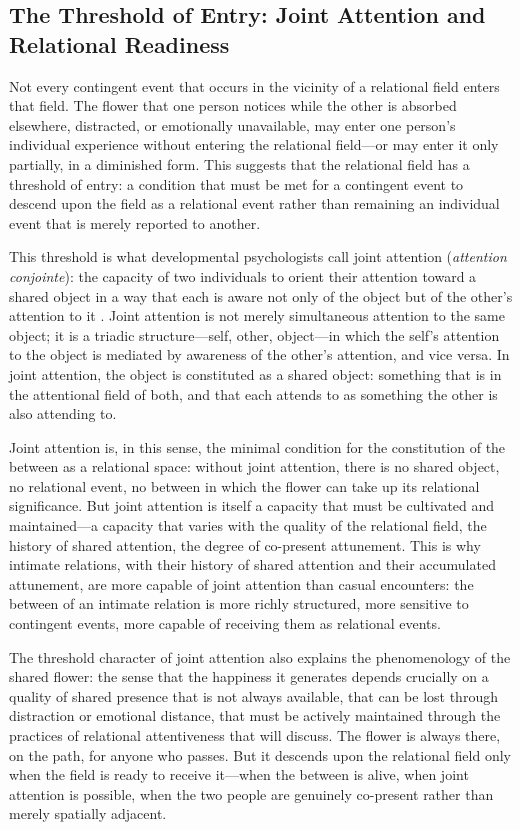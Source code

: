 \subsection{The Threshold of Entry: Joint Attention and Relational Readiness}
\label{p14:subsec:threshold}

\noindent
Not every contingent event that occurs in the vicinity of a relational field enters that field. The flower that one person notices while the other is absorbed elsewhere, distracted, or emotionally unavailable, may enter one person's individual experience without entering the relational field---or may enter it only partially, in a diminished form. This suggests that the relational field has a threshold of entry: a condition that must be met for a contingent event to descend upon the field as a relational event rather than remaining an individual event that is merely reported to another.

This threshold is what developmental psychologists call joint attention (\emph{attention conjointe}): the capacity of two individuals to orient their attention toward a shared object in a way that each is aware not only of the object but of the other's attention to it \parencite{hasson2012}. Joint attention is not merely simultaneous attention to the same object; it is a triadic structure---self, other, object---in which the self's attention to the object is mediated by awareness of the other's attention, and vice versa. In joint attention, the object is constituted as a shared object: something that is in the attentional field of both, and that each attends to as something the other is also attending to.

Joint attention is, in this sense, the minimal condition for the constitution of the between as a relational space: without joint attention, there is no shared object, no relational event, no between in which the flower can take up its relational significance. But joint attention is itself a capacity that must be cultivated and maintained---a capacity that varies with the quality of the relational field, the history of shared attention, the degree of co-present attunement. This is why intimate relations, with their history of shared attention and their accumulated attunement, are more capable of joint attention than casual encounters: the between of an intimate relation is more richly structured, more sensitive to contingent events, more capable of receiving them as relational events.

The threshold character of joint attention also explains the phenomenology of the shared flower: the sense that the happiness it generates depends crucially on a quality of shared presence that is not always available, that can be lost through distraction or emotional distance, that must be actively maintained through the practices of relational attentiveness that  will discuss. The flower is always there, on the path, for anyone who passes. But it descends upon the relational field only when the field is ready to receive it---when the between is alive, when joint attention is possible, when the two people are genuinely co-present rather than merely spatially adjacent.

